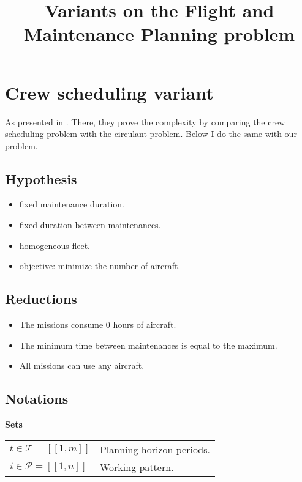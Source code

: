 \documentclass[a4paper,11pt]{article}
\title{Variants on the Flight and Maintenance Planning problem}
\author{}
\begin{document}
\maketitle

\section{Crew scheduling variant}

    As presented in \cite{Brunner2013}. There, they prove the complexity by comparing the crew scheduling problem with the circulant problem. Below I do the same with our problem.

    \subsection{Hypothesis}

    \begin{itemize}
     \item fixed maintenance duration.
     \item fixed duration between maintenances.
     \item homogeneous fleet.
     \item objective: minimize the number of aircraft.
    \end{itemize}

    \subsection{Reductions}

    \begin{itemize}
        \item The missions consume 0 hours of aircraft.
        \item The minimum time between maintenances is equal to the maximum.
        \item All missions can use any aircraft.
    \end{itemize}

    \subsection{Notations}

    \textbf{Sets}

    \begin{tabular}{ll}
    $t \in \mathcal{T} = [\![1, m]\!]$ & Planning horizon periods. \\
    $i \in \mathcal{P} = [\![1, n]\!]$ & Working pattern.\\
    \end{tabular}
\end{document}
